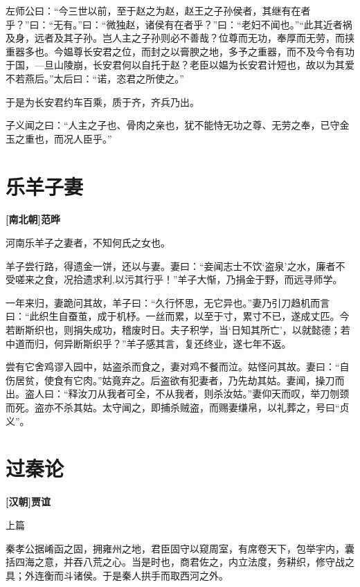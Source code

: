 \documentclass[UTF8,titlepage,oneside]{ctexbook}
\begin{document}
左师公曰：“今三世以前，至于赵之为赵，赵王之子孙侯者，其继有在者乎？”曰：“无有。”曰：“微独赵，诸侯有在者乎？”曰：“老妇不闻也。”“此其近者祸及身，远者及其子孙。岂人主之子孙则必不善哉？位尊而无功，奉厚而无劳，而挟重器多也。今媪尊长安君之位，而封之以膏腴之地，多予之重器，而不及今令有功于国，—旦山陵崩，长安君何以自托于赵？老臣以媪为长安君计短也，故以为其爱不若燕后。”太后曰：“诺，恣君之所使之。”


于是为长安君约车百乘，质于齐，齐兵乃出。


子义闻之曰：“人主之子也、骨肉之亲也，犹不能恃无功之尊、无劳之奉，已守金玉之重也，而况人臣乎。”



\chapter*{乐羊子妻}
\begin{center}
	\textbf{[南北朝]范晔}
\end{center}


河南乐羊子之妻者，不知何氏之女也。


羊子尝行路，得遗金一饼，还以与妻。妻曰：“妾闻志士不饮‘盗泉’之水，廉者不受嗟来之食，况拾遗求利,以污其行乎！”羊子大惭，乃捐金于野，而远寻师学。


一年来归，妻跪问其故，羊子曰：“久行怀思，无它异也。”妻乃引刀趋机而言曰：“此织生自蚕茧，成于机杼。一丝而累，以至于寸，累寸不已，遂成丈匹。今若断斯织也，则捐失成功，稽废时日。夫子积学，当‘日知其所亡’，以就懿德；若中道而归，何异断斯织乎？”羊子感其言，复还终业，遂七年不返。


尝有它舍鸡谬入园中，姑盗杀而食之，妻对鸡不餐而泣。姑怪问其故。妻曰：“自伤居贫，使食有它肉。”姑竟弃之。后盗欲有犯妻者，乃先劫其姑。妻闻，操刀而出。盗人曰：“释汝刀从我者可全，不从我者，则杀汝姑。”妻仰天而叹，举刀刎颈而死。盗亦不杀其姑。太守闻之，即捕杀贼盗，而赐妻缣帛，以礼葬之，号曰“贞义”。



\chapter*{过秦论}
\begin{center}
	\textbf{[汉朝]贾谊}
\end{center}


上篇

秦孝公据崤函之固，拥雍州之地，君臣固守以窥周室，有席卷天下，包举宇内，囊括四海之意，并吞八荒之心。当是时也，商君佐之，内立法度，务耕织，修守战之具；外连衡而斗诸侯。于是秦人拱手而取西河之外。
\end{document}
